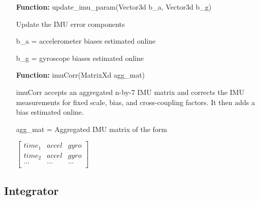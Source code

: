 \documentclass[11pt,a4paper]{article}
\begin{document}
\begin{itemize}
	\item[\textbf{Function:}] update\_imu\_param(Vector3d b\_a, Vector3d b\_g)

		Update the IMU error components
		
        b\_a = accelerometer biases estimated online

        b\_g = gyroscope biases estimated online
        
	\item[\textbf{Function:}] imuCorr(MatrixXd agg\_mat)
        
		imuCorr accepts an aggregated n-by-7 IMU matrix and corrects the IMU measurements for fixed scale, bias, and cross-coupling factors. It then adds a bias estimated online.        
        
        agg\_mat = Aggregated IMU matrix of the form
        
        $\left[\begin{array}{ccc}
					time_1 & accel & gyro \\
					time_2 & accel & gyro \\
					...    & ...   & ...  \\	
		\end{array}\right]$
	\end{itemize}
	
	\subsection{Integrator}
	
\end{document}
